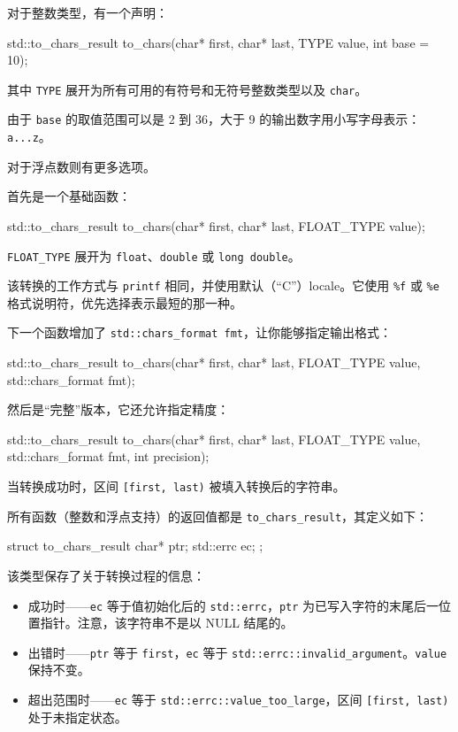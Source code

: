 对于整数类型，有一个声明：

\begin{codebox}[cpp]
std::to_chars_result to_chars(char* first, char* last,
                              TYPE value, int base = 10);
\end{codebox}

其中 \texttt{TYPE} 展开为所有可用的有符号和无符号整数类型以及 \texttt{char}。

由于 \texttt{base} 的取值范围可以是 2 到 36，大于 9 的输出数字用小写字母表示：\texttt{a...z}。

对于浮点数则有更多选项。

首先是一个基础函数：

\begin{codebox}[cpp]
std::to_chars_result to_chars(char* first, char* last, FLOAT_TYPE value);
\end{codebox}

\texttt{FLOAT\_TYPE} 展开为 \texttt{float}、\texttt{double} 或 \texttt{long double}。

该转换的工作方式与 \texttt{printf} 相同，并使用默认（“C”）locale。它使用 \texttt{\%f} 或 \texttt{\%e} 格式说明符，优先选择表示最短的那一种。

下一个函数增加了 \texttt{std::chars\_format fmt}，让你能够指定输出格式：

\begin{codebox}[cpp]
std::to_chars_result to_chars(char* first, char* last,
                              FLOAT_TYPE value,
                              std::chars_format fmt);
\end{codebox}

然后是“完整”版本，它还允许指定精度：

\begin{codebox}[cpp]
std::to_chars_result to_chars(char* first, char* last,
                              FLOAT_TYPE value,
                              std::chars_format fmt,
                              int precision);
\end{codebox}

当转换成功时，区间 \texttt{[first, last)} 被填入转换后的字符串。

所有函数（整数和浮点支持）的返回值都是 \texttt{to\_chars\_result}，其定义如下：

\begin{codebox}[cpp]
struct to_chars_result {
    char* ptr;
    std::errc ec;
};
\end{codebox}

该类型保存了关于转换过程的信息：
\begin{itemize}
\item 成功时——\texttt{ec} 等于值初始化后的 \texttt{std::errc}，\texttt{ptr} 为已写入字符的末尾后一位置指针。注意，该字符串不是以 NULL 结尾的。
\item 出错时——\texttt{ptr} 等于 \texttt{first}，\texttt{ec} 等于 \texttt{std::errc::invalid\_argument}。\texttt{value} 保持不变。
\item 超出范围时——\texttt{ec} 等于 \texttt{std::errc::value\_too\_large}，区间 \texttt{[first, last)} 处于未指定状态。
\end{itemize}

